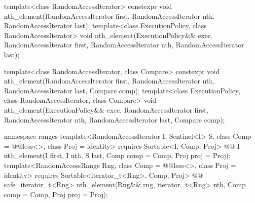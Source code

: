 %
\begin{itemdecl}
template<class RandomAccessIterator>
  constexpr void nth_element(RandomAccessIterator first, RandomAccessIterator nth,
                             RandomAccessIterator last);
template<class ExecutionPolicy, class RandomAccessIterator>
  void nth_element(ExecutionPolicy&& exec,
                   RandomAccessIterator first, RandomAccessIterator nth,
                   RandomAccessIterator last);

template<class RandomAccessIterator, class Compare>
  constexpr void nth_element(RandomAccessIterator first, RandomAccessIterator nth,
                             RandomAccessIterator last,  Compare comp);
template<class ExecutionPolicy, class RandomAccessIterator, class Compare>
  void nth_element(ExecutionPolicy&& exec,
                   RandomAccessIterator first, RandomAccessIterator nth,
                   RandomAccessIterator last, Compare comp);
\end{itemdecl}
\begin{addedblock}
\begin{itemdecl}
namespace ranges {
  template<RandomAccessIterator I, Sentinel<I> S, class Comp = @@less<>,
      class Proj = identity>
    requires Sortable<I, Comp, Proj>
    @@ I
      nth_element(I first, I nth, S last, Comp comp = Comp{}, Proj proj = Proj{});
  template<RandomAccessRange Rng, class Comp = @@less<>, class Proj = identity>
    requires Sortable<iterator_t<Rng>, Comp, Proj>
    @@ safe_iterator_t<Rng>
      nth_element(Rng&& rng, iterator_t<Rng> nth, Comp comp = Comp{}, Proj proj = Proj{});
}
\end{itemdecl}
\end{addedblock}

